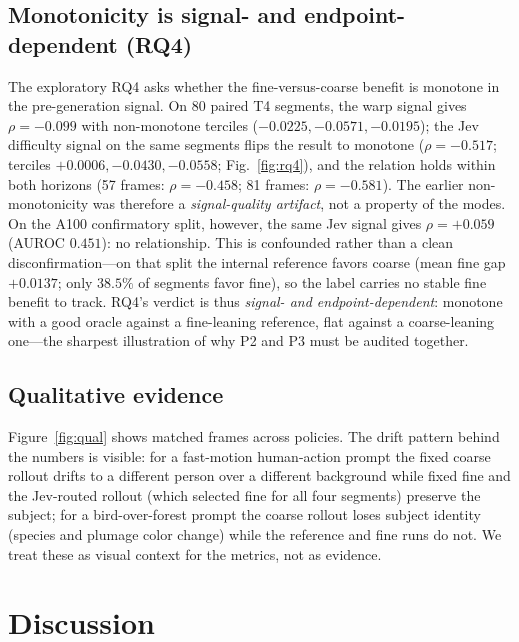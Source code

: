 \documentclass[journal]{IEEEtran}
\begin{document}
\subsection{Monotonicity is signal- and endpoint-dependent (RQ4)}
\label{sec:rq4}

The exploratory RQ4 asks whether the fine-versus-coarse benefit is monotone in the pre-generation signal. On 80 paired T4 segments, the warp signal gives $\rho = -0.099$ with non-monotone terciles ($-0.0225, -0.0571, -0.0195$); the Jev difficulty signal on the same segments flips the result to monotone ($\rho = -0.517$; terciles $+0.0006, -0.0430, -0.0558$; Fig.~\ref{fig:rq4}), and the relation holds within both horizons (57 frames: $\rho=-0.458$; 81 frames: $\rho=-0.581$). The earlier non-monotonicity was therefore a \emph{signal-quality artifact}, not a property of the modes. On the A100 confirmatory split, however, the same Jev signal gives $\rho = +0.059$ (AUROC $0.451$): no relationship. This is confounded rather than a clean disconfirmation---on that split the internal reference favors coarse (mean fine gap $+0.0137$; only $38.5\%$ of segments favor fine), so the label carries no stable fine benefit to track. RQ4's verdict is thus \emph{signal- and endpoint-dependent}: monotone with a good oracle against a fine-leaning reference, flat against a coarse-leaning one---the sharpest illustration of why P2 and P3 must be audited together.

\subsection{Qualitative evidence}
\label{sec:qual}

Figure~\ref{fig:qual} shows matched frames across policies. The drift pattern behind the numbers is visible: for a fast-motion human-action prompt the fixed coarse rollout drifts to a different person over a different background while fixed fine and the Jev-routed rollout (which selected fine for all four segments) preserve the subject; for a bird-over-forest prompt the coarse rollout loses subject identity (species and plumage color change) while the reference and fine runs do not. We treat these as visual context for the metrics, not as evidence.

\section{Discussion}
\label{sec:discussion}
\end{document}
